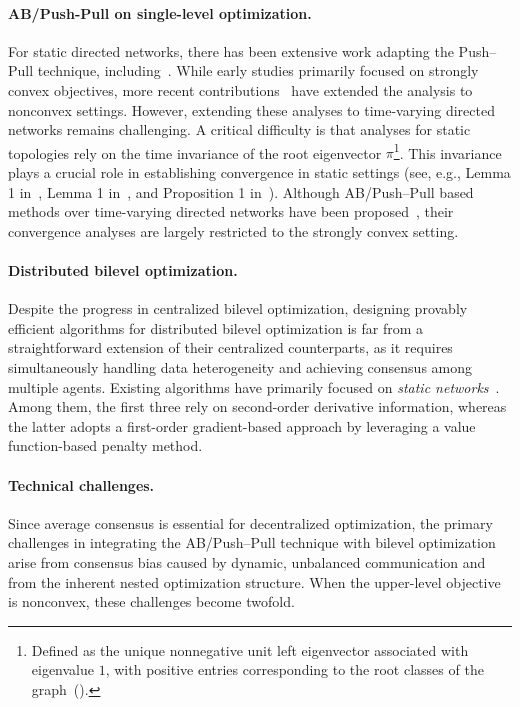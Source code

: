 \documentclass{article}
\theoremstyle{plain}
\theoremstyle{definition}
\theoremstyle{remark}
\begin{document}
\paragraph{AB/Push-Pull on single-level optimization.}
For static directed networks, there has been extensive work adapting the Push–Pull technique, including~\cite{Usman_pp2018,xin2019distributed,xinab2020,Nedic_pp2021,zhaosab2024,puBTPP2024}. 
While early studies primarily focused on strongly convex objectives, more recent contributions~\cite{yuan_pp2025,pu_pp2025} have extended the analysis to nonconvex settings.
However, extending these analyses to time-varying directed networks remains challenging.  
A critical difficulty is that analyses for static topologies rely on the time invariance of the root eigenvector $\pi$\footnote{Defined as the unique nonnegative unit left eigenvector associated with eigenvalue $1$, with positive entries corresponding to the root classes of the graph~(\citealp[Definition 2.2]{pu_pp2025}).}. 
This invariance plays a crucial role in establishing convergence in static settings (see, e.g., Lemma 1 in~\citealp{Usman_pp2018}, Lemma 1 in~\citealp{Nedic_pp2021}, and Proposition 1 in~\citealp{yuan_pp2025}). 
Although AB/Push–Pull based methods over time-varying directed networks have been proposed~\cite{Usman2020tv,nedicacc2024,Nedic2025tvd}, their convergence analyses are largely restricted to the strongly convex setting.

\paragraph{Distributed bilevel optimization.} 
Despite the progress in centralized bilevel optimization, designing provably efficient algorithms for distributed bilevel optimization is far from a straightforward extension of their centralized counterparts, as it requires simultaneously handling data heterogeneity and achieving consensus among multiple agents. Existing algorithms have primarily focused on \textit{static networks}~\cite{YangDBO2022,YuanDBO2024,ChenDBO2025,wang2025fully}. 
Among them, the first three rely on second-order derivative information, whereas the latter adopts a first-order gradient-based approach by leveraging a value function-based penalty method.

\paragraph{Technical challenges.}
Since average consensus is essential for decentralized optimization, the primary challenges in integrating the AB/Push–Pull technique with bilevel optimization arise from consensus bias caused by dynamic, unbalanced communication and from the inherent nested optimization structure. 
When the upper-level objective is nonconvex, these challenges become twofold. 
\end{document}
